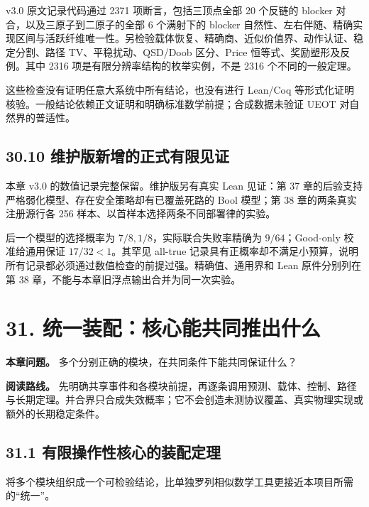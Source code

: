 \documentclass[
  11pt,
  oneside]{book}
\begin{document}
v3.0 原文记录代码通过 2371 项断言，包括三顶点全部 20 个反链的 blocker 对合，以及三原子到二原子的全部 6 个满射下的 blocker 自然性、左右伴随、精确实现区间与活跃纤维唯一性。另检验载体恢复、精确商、近似价值界、动作认证、稳定分割、路径 TV、平稳扰动、QSD/Doob 区分、Price 恒等式、奖励塑形及反例。其中 2316 项是有限分辨率结构的枚举实例，不是 2316 个不同的一般定理。

这些检查没有证明任意大系统中所有结论，也没有进行 Lean/Coq 等形式化证明核验。一般结论依赖正文证明和明确标准数学前提；合成数据未验证 UEOT 对自然界的普适性。

\section{30.10 维护版新增的正式有限见证}\label{ux7ef4ux62a4ux7248ux65b0ux589eux7684ux6b63ux5f0fux6709ux9650ux89c1ux8bc1}

本章 v3.0 的数值记录完整保留。维护版另有真实 Lean 见证：第 37 章的后验支持严格弱化模型、存在安全策略却有已覆盖死路的 Bool 模型；第 38 章的两条真实注册源行各 256 样本、以首样本选择两条不同部署律的实验。

后一个模型的选择概率为 \(7/8,1/8\)，实际联合失败率精确为 \(9/64\)；Good-only 校准给通用保证 \(17/32<1\)。其罕见 all-true 记录具有正概率却不满足小预算，说明所有记录都必须通过数值检查的前提过强。精确值、通用界和 Lean 原件分别列在第 38 章，不能与本章旧浮点输出合并为同一次实验。

\chapter{31. 统一装配：核心能共同推出什么}\label{ch-31}

\textbf{本章问题。} 多个分别正确的模块，在共同条件下能共同保证什么？

\textbf{阅读路线。} 先明确共享事件和各模块前提，再逐条调用预测、载体、控制、路径与长期定理。并合界只合成失效概率；它不会创造未测协议覆盖、真实物理实现或额外的长期稳定条件。

\section{31.1 有限操作性核心的装配定理}\label{ux6709ux9650ux64cdux4f5cux6027ux6838ux5fc3ux7684ux88c5ux914dux5b9aux7406}

将多个模块组织成一个可检验结论，比单独罗列相似数学工具更接近本项目所需的``统一''。

\hypertarget{p-core-01}{}\label{p-core-01}
\end{document}
